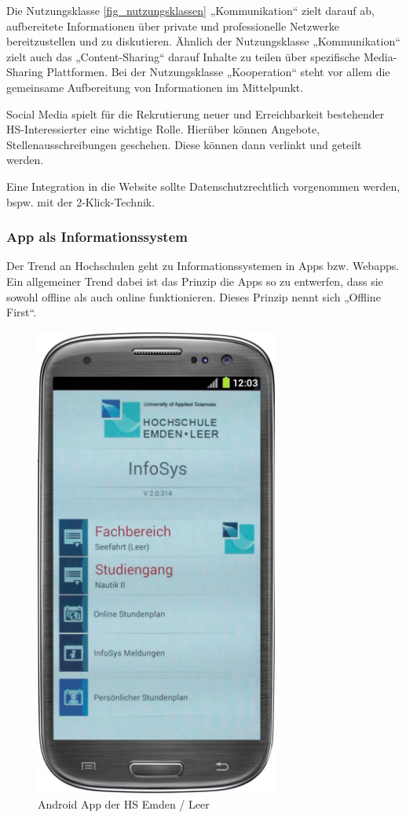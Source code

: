 Die Nutzungsklasse \ref{fig_nutzungsklassen} „Kommunikation“ zielt darauf ab, aufbereitete Informationen über private und professionelle Netzwerke bereitzustellen und zu diskutieren.
Ähnlich der Nutzungsklasse „Kommunikation“ zielt auch das „Content-Sharing“ darauf Inhalte zu teilen über spezifische Media-Sharing Plattformen.
Bei der Nutzungsklasse „Kooperation“ steht vor allem die gemeinsame Aufbereitung von Informationen im Mittelpunkt.

Social Media spielt für die Rekrutierung neuer und Erreichbarkeit bestehender HS-Interessierter eine wichtige Rolle. Hierüber können Angebote, Stellenausschreibungen geschehen. Diese können dann verlinkt und geteilt werden. 

Eine Integration in die Website sollte Datenschutzrechtlich vorgenommen werden, bspw. mit der 2-Klick-Technik.




\subsubsection{App als Informationssystem}
\label{android_app_als_is}
Der Trend an Hochschulen geht zu Informationssystemen in Apps bzw. Webapps. Ein allgemeiner Trend dabei ist das Prinzip die Apps so zu entwerfen, dass sie sowohl offline als auch online funktionieren. Dieses Prinzip nennt sich „Offline First“.

\begin{figure}[h!]
	\centering
	\includegraphics[width=8cm]{kapitel/gruppe1_2/bilder/hsel-androidapp}
	\caption{Android App der HS Emden / Leer}
	\label{fig_hselandroidapp}
\end{figure}
\newpage

